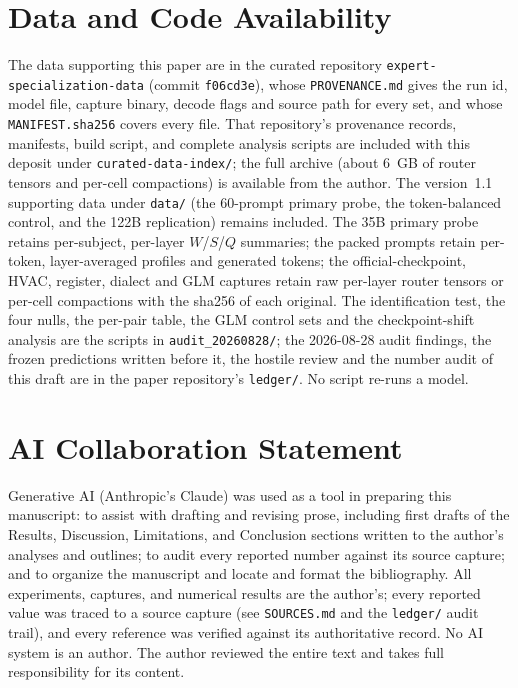 \documentclass[10pt,twocolumn]{article}
\begin{document}
\section*{Data and Code Availability}
The data supporting this paper are in the curated repository \texttt{expert-specialization-data} (commit \texttt{f06cd3e}), whose \texttt{PROVENANCE.md} gives the run id, model file, capture binary, decode flags and source path for every set, and whose \texttt{MANIFEST.sha256} covers every file. That repository's provenance records, manifests, build script, and complete analysis scripts are included with this deposit under \texttt{curated-data-index/}; the full archive (about 6~GB of router tensors and per-cell compactions) is available from the author. The version~1.1 supporting data under \texttt{data/} (the 60-prompt primary probe, the token-balanced control, and the 122B replication) remains included. The 35B primary probe retains per-subject, per-layer $W$/$S$/$Q$ summaries; the packed prompts retain per-token, layer-averaged profiles and generated tokens; the official-checkpoint, HVAC, register, dialect and GLM captures retain raw per-layer router tensors or per-cell compactions with the sha256 of each original. The identification test, the four nulls, the per-pair table, the GLM control sets and the checkpoint-shift analysis are the scripts in \texttt{audit\_20260828/}; the 2026-08-28 audit findings, the frozen predictions written before it, the hostile review and the number audit of this draft are in the paper repository's \texttt{ledger/}. No script re-runs a model.

\section*{AI Collaboration Statement}

Generative AI (Anthropic's Claude) was used as a tool in preparing this
manuscript: to assist with drafting and revising prose, including first
drafts of the Results, Discussion, Limitations, and Conclusion sections
written to the author's analyses and outlines; to audit every reported
number against its source capture; and to organize the manuscript and
locate and format the bibliography. All experiments, captures, and
numerical results are the author's; every reported value was traced to a
source capture (see \texttt{SOURCES.md} and the \texttt{ledger/} audit
trail), and every reference was verified against its authoritative record.
No AI system is an author. The author reviewed the entire text and takes
full responsibility for its content.
\end{document}
